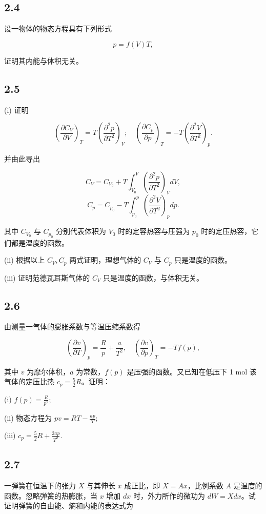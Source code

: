 \newpage
\subsection{2.4}
设一物体的物态方程具有下列形式

$$p = f(V) T,$$

证明其内能与体积无关。

\newpage
\subsection{2.5}
(i) 证明

$$\left( \frac{\partial C_V}{\partial V} \right)_T = T \left( \frac{\partial^2 p}{\partial T^2} \right)_V; \quad \left( \frac{\partial C_p}{\partial p} \right)_T = -T \left( \frac{\partial^2 V}{\partial T^2} \right)_p.$$

并由此导出

$$C_V = C_{V_0} + T \int_{V_0}^V \left( \frac{\partial^2 p}{\partial T^2} \right)_V dV,$$
$$C_p = C_{p_0} - T \int_{p_0}^p \left( \frac{\partial^2 V}{\partial T^2} \right)_p dp.$$

其中 $C_{V_0}$ 与 $C_{p_0}$ 分别代表体积为 $V_0$ 时的定容热容与压强为 $p_0$ 时的定压热容，它们都是温度的函数。

(ii) 根据以上 $C_V, C_p$ 两式证明，理想气体的 $C_V$ 与 $C_p$ 只是温度的函数。

(iii) 证明范德瓦耳斯气体的 $C_V$ 只是温度的函数，与体积无关。

\newpage
\subsection{2.6}
由测量一气体的膨胀系数与等温压缩系数得

$$\left( \frac{\partial v}{\partial T} \right)_p = \frac{R}{p} + \frac{a}{T^2}, \quad \left( \frac{\partial v}{\partial p} \right)_T = -Tf(p),$$

其中 $v$ 为摩尔体积，$a$ 为常数，$f(p)$ 是压强的函数。又已知在低压下 1 mol 该气体的定压比热 $c_p = \frac{5}{2} R$。证明：

(i) $f(p) = \frac{R}{p^2}$;

(ii) 物态方程为 $pv = RT - \frac{ap}{T}$;

(iii) $c_p = \frac{5}{2} R + \frac{2ap}{T^2}$.

\newpage
\subsection{2.7}
一弹簧在恒温下的张力 $X$ 与其伸长 $x$ 成正比，即 $X = Ax$，比例系数 $A$ 是温度的函数。忽略弹簧的热膨胀，当 $x$ 增加 $dx$ 时，外力所作的微功为 $dW = Xdx$。试证明弹簧的自由能、熵和内能的表达式为

